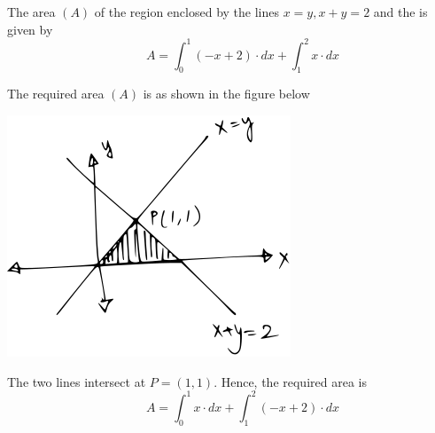 \documentclass[14pt,fleqn]{extarticle}
\begin{document}
 
\begin{snippet}
    
    \incorrect
    
    The area $(A)$ of the region enclosed by the lines $x = y, x + y =2$ and the \xaxis is given by 
    \[ \qquad A = \int_0^1 \left(-x+2 \right)\cdot dx + \int_1^2 x\cdot dx \]
    
    \reason
    
    The required area $(A)$ is as shown in the figure below 
    
    \begin{center}
\includegraphics[scale=1.4]{figure.svg}
\end{center}

    The two lines intersect at $P = (1,1)$. Hence, the required area is 
    \[ \qquad A = \int_0^1 x\cdot dx + \int_1^2 \left(-x+2 \right)\cdot dx \]
    
\end{snippet} 
\end{document}
